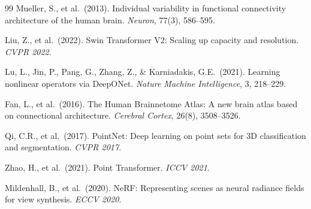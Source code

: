 \documentclass[11pt,letterpaper]{article}
\begin{document}
\begin{thebibliography}{99}
Mueller, S., et al.\ (2013).
Individual variability in functional connectivity architecture of the human brain.
\textit{Neuron}, 77(3), 586--595.

Liu, Z., et al.\ (2022).
Swin Transformer V2: Scaling up capacity and resolution.
\textit{CVPR 2022}.

Lu, L., Jin, P., Pang, G., Zhang, Z., \& Karniadakis, G.E.\ (2021).
Learning nonlinear operators via DeepONet.
\textit{Nature Machine Intelligence}, 3, 218--229.

Fan, L., et al.\ (2016).
The Human Brainnetome Atlas: A new brain atlas based on connectional architecture.
\textit{Cerebral Cortex}, 26(8), 3508--3526.

Qi, C.R., et al.\ (2017).
PointNet: Deep learning on point sets for 3D classification and segmentation.
\textit{CVPR 2017}.

Zhao, H., et al.\ (2021).
Point Transformer.
\textit{ICCV 2021}.

Mildenhall, B., et al.\ (2020).
NeRF: Representing scenes as neural radiance fields for view synthesis.
\textit{ECCV 2020}.

\end{thebibliography}
\end{document}
